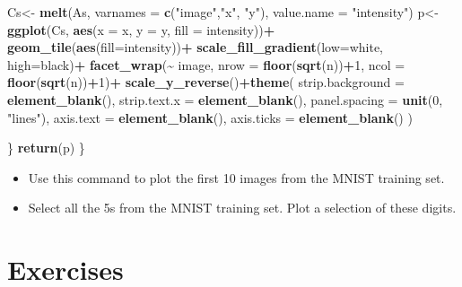 \documentclass[
]{book}
\newenvironment{Shaded}{\begin{snugshade}}{\end{snugshade}}
\newcommand{\AttributeTok}[1]{\textcolor[rgb]{0.13,0.29,0.53}{#1}}
\newcommand{\DecValTok}[1]{\textcolor[rgb]{0.00,0.00,0.81}{#1}}
\newcommand{\FunctionTok}[1]{\textcolor[rgb]{0.13,0.29,0.53}{\textbf{#1}}}
\newcommand{\NormalTok}[1]{#1}
\newcommand{\OtherTok}[1]{\textcolor[rgb]{0.56,0.35,0.01}{#1}}
\newcommand{\SpecialCharTok}[1]{\textcolor[rgb]{0.81,0.36,0.00}{\textbf{#1}}}
\newcommand{\StringTok}[1]{\textcolor[rgb]{0.31,0.60,0.02}{#1}}
\theoremstyle{definition}
\theoremstyle{definition}
\theoremstyle{definition}
\theoremstyle{definition}
\theoremstyle{remark}
\begin{document}
\begin{Shaded}
\begin{Highlighting}[]
\NormalTok{    Cs}\OtherTok{\textless{}{-}} \FunctionTok{melt}\NormalTok{(As, }\AttributeTok{varnames =} \FunctionTok{c}\NormalTok{(}\StringTok{"image"}\NormalTok{,}\StringTok{"x"}\NormalTok{, }\StringTok{"y"}\NormalTok{), }
              \AttributeTok{value.name =} \StringTok{"intensity"}\NormalTok{)}
\NormalTok{    p}\OtherTok{\textless{}{-}}\FunctionTok{ggplot}\NormalTok{(Cs, }\FunctionTok{aes}\NormalTok{(}\AttributeTok{x =}\NormalTok{ x, }\AttributeTok{y =}\NormalTok{ y, }\AttributeTok{fill =}\NormalTok{ intensity))}\SpecialCharTok{+}
      \FunctionTok{geom\_tile}\NormalTok{(}\FunctionTok{aes}\NormalTok{(}\AttributeTok{fill=}\NormalTok{intensity))}\SpecialCharTok{+}
      \FunctionTok{scale\_fill\_gradient}\NormalTok{(}\AttributeTok{low=}\StringTok{\textquotesingle{}white\textquotesingle{}}\NormalTok{, }\AttributeTok{high=}\StringTok{\textquotesingle{}black\textquotesingle{}}\NormalTok{)}\SpecialCharTok{+}
      \FunctionTok{facet\_wrap}\NormalTok{(}\SpecialCharTok{\textasciitilde{}}\NormalTok{ image, }\AttributeTok{nrow =} \FunctionTok{floor}\NormalTok{(}\FunctionTok{sqrt}\NormalTok{(n))}\SpecialCharTok{+}\DecValTok{1}\NormalTok{, }
                 \AttributeTok{ncol =} \FunctionTok{floor}\NormalTok{(}\FunctionTok{sqrt}\NormalTok{(n))}\SpecialCharTok{+}\DecValTok{1}\NormalTok{)}\SpecialCharTok{+}
      \FunctionTok{scale\_y\_reverse}\NormalTok{()}\SpecialCharTok{+}\FunctionTok{theme}\NormalTok{(}
        \AttributeTok{strip.background =} \FunctionTok{element\_blank}\NormalTok{(),}
        \AttributeTok{strip.text.x =} \FunctionTok{element\_blank}\NormalTok{(),}
        \AttributeTok{panel.spacing =} \FunctionTok{unit}\NormalTok{(}\DecValTok{0}\NormalTok{, }\StringTok{"lines"}\NormalTok{),}
        \AttributeTok{axis.text =} \FunctionTok{element\_blank}\NormalTok{(),}
        \AttributeTok{axis.ticks =} \FunctionTok{element\_blank}\NormalTok{()}
\NormalTok{      ) }
    
\NormalTok{  \}}
  \FunctionTok{return}\NormalTok{(p)}
\NormalTok{\}}
\end{Highlighting}
\end{Shaded}

\begin{itemize}
\item
  Use this command to plot the first 10 images from the MNIST training set.
\item
  Select all the 5s from the MNIST training set. Plot a selection of these digits.
\end{itemize}

\hypertarget{exercises}{%
\section{Exercises}\label{exercises}}
\end{document}
